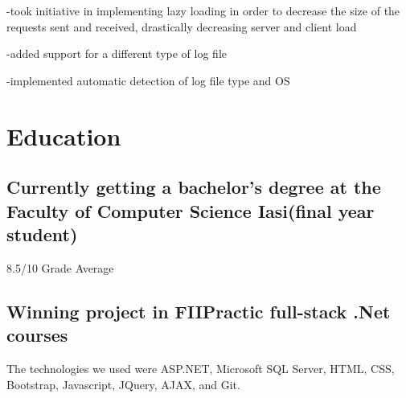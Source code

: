 \documentclass[a4paper,hidelinks,11pt]{article}
\begin{document}
-took initiative in implementing lazy loading in order to decrease the size of the requests sent and received, drastically decreasing server and client load

-added support for a different type of log file

-implemented automatic detection of log file type and OS



\section{Education}
\subsection{Currently getting a bachelor's degree at 
the Faculty of Computer Science Iasi(final year student)}
 8.5/10 Grade Average


\subsection{Winning project in FIIPractic full-stack .Net courses}

The technologies we used were ASP.NET, Microsoft SQL Server, HTML, CSS, Bootstrap, Javascript,
JQuery, AJAX, and Git. 
\end{document}
